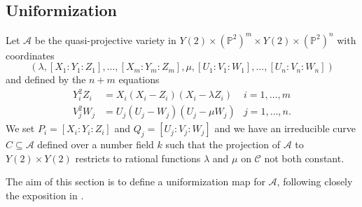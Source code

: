 \documentclass[11pt,a4paper,reqno]{amsart}
\numberwithin{equation}{section}
\renewcommand{\P}{\mathbb{P}}
\renewcommand{\c}{\mathcal{C}}
\renewcommand{\l}{\lambda}
\newcommand{\m}{\mu}
\newcommand{\pq}[1]{\left[ #1 \right]}
\theoremstyle{remark}
\theoremstyle{definition}
\theoremstyle{definition}
\begin{document}
\subsection{Uniformization}\label{sec_unif}
Let $\mathcal{A}$ be the quasi-projective variety in $Y(2)\times (\P^2)^m\times Y(2) \times (\P^2)^n$ with coordinates 
$$(\l, \pq{X_1:Y_1:Z_1}, \ldots, \pq{X_m:Y_m:Z_m}, \m, \pq{U_1:V_1:W_1}, \ldots, \pq{U_n:V_n:W_n})$$
and defined by the $n+m$ equations
\begin{align*}
Y_i^2Z_i &=X_i(X_i-Z_i)(X_i-\l Z_i) & i=1, \ldots, m\\
V_j^2W_j &=U_j(U_j-W_j)(U_j-\m W_j) & j=1, \ldots, n.
\end{align*}
We set $P_i=\pq{X_i:Y_i:Z_i}$ and $Q_j=\pq{U_j:V_j:W_j}$ and we have an irreducible curve $C \subseteq \mathcal{A}$ defined over a number field $k$ such that the projection of $\mathcal{A}$ to $Y(2)\times Y(2)$ restricts to rational functions $\l$ and $\m$ on $\c$ not both constant.

The aim of this section is to define a uniformization map for $\mathcal{A}$, following closely the exposition in \cite[pp.~2489–2491]{Pil09b}.
\end{document}
